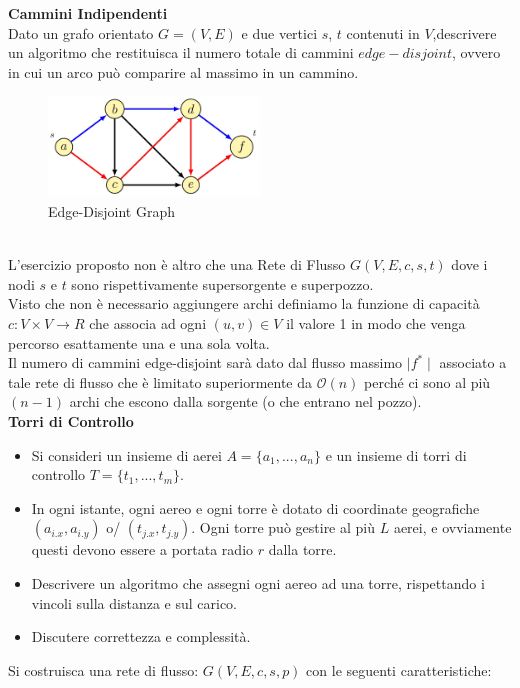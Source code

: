\documentclass[../cheatSheetAlgoritmi.tex]{subfiles}
\begin{document}
\textbf{Cammini Indipendenti}\\
Dato un grafo orientato $G= (V, E)$ e due vertici $s$, $t$ contenuti in $V$,descrivere un algoritmo che restituisca il numero totale di cammini $edge-disjoint$, ovvero in cui un arco può comparire al massimo in un cammino.
\begin{figure}[h]
\caption{Edge-Disjoint Graph}
\centering
\includegraphics[width=0.5\textwidth]{../img/Locale_1.jpg}
\end{figure} \\
L'esercizio proposto non è altro che una Rete di Flusso $G(V, E, c, s, t)$ dove i nodi $s$ e $t$ sono rispettivamente supersorgente e superpozzo.\\
Visto che non è necessario aggiungere archi definiamo la funzione di capacità $c: V \times V \rightarrow R$  che associa ad ogni $(u, v) \in V$ il valore 1 in modo che venga percorso esattamente una e una sola volta.\\
Il numero di cammini edge-disjoint sarà dato dal flusso massimo $\mid f^* \mid$ associato a tale rete di flusso che è limitato superiormente da $\mathcal{O}(n)$ perché ci sono al più $(n-1)$ archi che escono dalla sorgente (o che entrano nel pozzo).\\
\textbf{Torri di Controllo}
\begin{itemize}
    \item Si consideri un insieme di aerei $A=\{a_1,..., a_n\}$ e un insieme di torri di controllo $T=\{t_1,..., t_m\}$.
    \item In ogni istante, ogni aereo e ogni torre è dotato di coordinate geografiche $(a_{i.x}, a_{i.y})$ o/ $(t_{j.x}, t_{j.y})$. Ogni torre può gestire al più $L$ aerei, e ovviamente questi devono essere a portata radio $r$ dalla torre. 
    \item Descrivere un algoritmo che assegni ogni aereo ad una torre, rispettando i vincoli sulla distanza e sul carico. 
    \item Discutere correttezza e complessità.
\end{itemize}
Si costruisca una rete di flusso: $G(V, E, c, s, p)$ con le seguenti caratteristiche:
\end{document}
